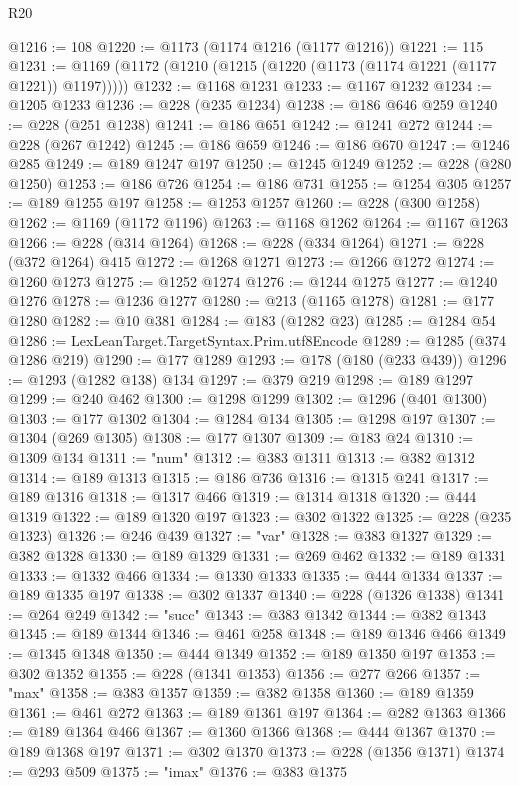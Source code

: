 \begin{lexlean}{R20}
\begin{coremodule}
@1216 := 108
@1220 := @1173 (@1174 @1216 (@1177 @1216))
@1221 := 115
@1231 := @1169 (@1172 (@1210 (@1215 (@1220 (@1173 (@1174 @1221 (@1177 @1221)) @1197)))))
@1232 := @1168 @1231
@1233 := @1167 @1232
@1234 := @1205 @1233
@1236 := @228 (@235 @1234)
@1238 := @186 @646 @259
@1240 := @228 (@251 @1238)
@1241 := @186 @651
@1242 := @1241 @272
@1244 := @228 (@267 @1242)
@1245 := @186 @659
@1246 := @186 @670
@1247 := @1246 @285
@1249 := @189 @1247 @197
@1250 := @1245 @1249
@1252 := @228 (@280 @1250)
@1253 := @186 @726
@1254 := @186 @731
@1255 := @1254 @305
@1257 := @189 @1255 @197
@1258 := @1253 @1257
@1260 := @228 (@300 @1258)
@1262 := @1169 (@1172 @1196)
@1263 := @1168 @1262
@1264 := @1167 @1263
@1266 := @228 (@314 @1264)
@1268 := @228 (@334 @1264)
@1271 := @228 (@372 @1264) @415
@1272 := @1268 @1271
@1273 := @1266 @1272
@1274 := @1260 @1273
@1275 := @1252 @1274
@1276 := @1244 @1275
@1277 := @1240 @1276
@1278 := @1236 @1277
@1280 := @213 (@1165 @1278)
@1281 := @177 @1280
@1282 := @10 @381
@1284 := @183 (@1282 @23)
@1285 := @1284 @54
@1286 := LexLeanTarget.TargetSyntax.Prim.utf8Encode
@1289 := @1285 (@374 @1286 @219)
@1290 := @177 @1289
@1293 := @178 (@180 (@233 @439))
@1296 := @1293 (@1282 @138) @134
@1297 := @379 @219
@1298 := @189 @1297
@1299 := @240 @462
@1300 := @1298 @1299
@1302 := @1296 (@401 @1300)
@1303 := @177 @1302
@1304 := @1284 @134
@1305 := @1298 @197
@1307 := @1304 (@269 @1305)
@1308 := @177 @1307
@1309 := @183 @24
@1310 := @1309 @134
@1311 := "num"
@1312 := @383 @1311
@1313 := @382 @1312
@1314 := @189 @1313
@1315 := @186 @736
@1316 := @1315 @241
@1317 := @189 @1316
@1318 := @1317 @466
@1319 := @1314 @1318
@1320 := @444 @1319
@1322 := @189 @1320 @197
@1323 := @302 @1322
@1325 := @228 (@235 @1323)
@1326 := @246 @439
@1327 := "var"
@1328 := @383 @1327
@1329 := @382 @1328
@1330 := @189 @1329
@1331 := @269 @462
@1332 := @189 @1331
@1333 := @1332 @466
@1334 := @1330 @1333
@1335 := @444 @1334
@1337 := @189 @1335 @197
@1338 := @302 @1337
@1340 := @228 (@1326 @1338)
@1341 := @264 @249
@1342 := "succ"
@1343 := @383 @1342
@1344 := @382 @1343
@1345 := @189 @1344
@1346 := @461 @258
@1348 := @189 @1346 @466
@1349 := @1345 @1348
@1350 := @444 @1349
@1352 := @189 @1350 @197
@1353 := @302 @1352
@1355 := @228 (@1341 @1353)
@1356 := @277 @266
@1357 := "max"
@1358 := @383 @1357
@1359 := @382 @1358
@1360 := @189 @1359
@1361 := @461 @272
@1363 := @189 @1361 @197
@1364 := @282 @1363
@1366 := @189 @1364 @466
@1367 := @1360 @1366
@1368 := @444 @1367
@1370 := @189 @1368 @197
@1371 := @302 @1370
@1373 := @228 (@1356 @1371)
@1374 := @293 @509
@1375 := "imax"
@1376 := @383 @1375

\end{coremodule}
\end{lexlean}
